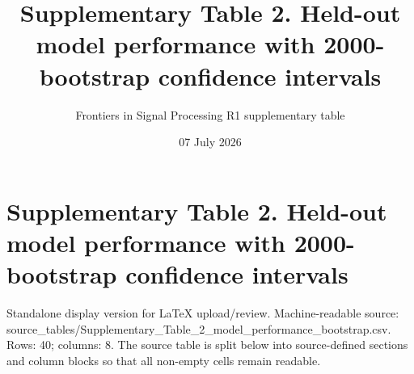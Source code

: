 \documentclass[11pt]{article}
\title{Supplementary Table 2. Held-out model performance with 2000-bootstrap confidence intervals}
\author{Frontiers in Signal Processing R1 supplementary table}
\date{07 July 2026}
\begin{document}
\maketitle

\section*{Supplementary Table 2. Held-out model performance with 2000-bootstrap confidence intervals}

Standalone display version for LaTeX upload/review. Machine-readable source: source\_\allowbreak{}tables/\allowbreak{}Supplementary\_\allowbreak{}Table\_\allowbreak{}2\_\allowbreak{}model\_\allowbreak{}performance\_\allowbreak{}bootstrap.\allowbreak{}csv. Rows: 40; columns: 8. The source table is split below into source-defined sections and column blocks so that all non-empty cells remain readable.
\end{document}
